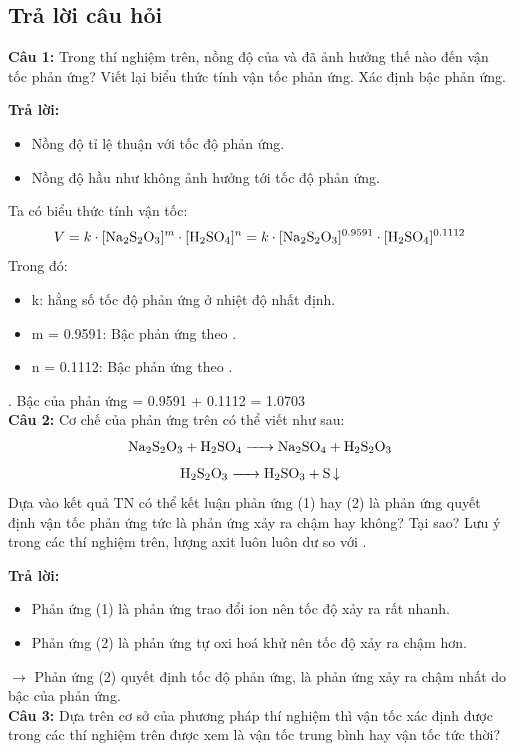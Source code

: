 \documentclass[12pt]{article}
\begin{document}
\subsection{Trả lời câu hỏi}
\textbf{Câu 1:} Trong thí nghiệm trên, nồng độ của  và  đã ảnh
hưởng thế nào đến vận tốc phản ứng? Viết lại biểu thức tính vận tốc phản
ứng. Xác định bậc phản ứng.

\textbf{Trả lời:}
\begin{itemize}
    \item Nồng độ  tỉ lệ thuận với tốc độ phản ứng.
    \item  Nồng độ  hầu như không ảnh hưởng tới tốc độ phản ứng.
\end{itemize}
Ta có biểu thức tính vận tốc:
\[
V = k \cdot [\ce{Na2S2O3}]^m \cdot [\ce{H2SO4}]^n = k \cdot [\ce{Na2S2O3}]^{0.9591} \cdot [\ce{H2SO4}]^{0.1112}
\]
Trong đó:
\begin{itemize}
    \item k: hằng số tốc độ phản ứng ở nhiệt độ nhất định.
    \item m = 0.9591: Bậc phản ứng theo .
    \item n = 0.1112: Bậc phản ứng theo .
\end{itemize} .
Bậc của phản ứng = 0.9591 + 0.1112 = 1.0703 \\
\textbf{Câu 2:} Cơ chế của phản ứng trên có thể viết như sau:
\begin{equation}
    \ce{Na2S2O3 + H2SO4 -> Na2SO4 + H2S2O3}
\end{equation}
\begin{equation}
    \ce{H2S2O3 -> H2SO3 + S \downarrow}
\end{equation}
Dựa vào kết quả TN có thể kết luận phản ứng (1) hay (2) là phản ứng quyết định
vận tốc phản ứng tức là phản ứng xảy ra chậm hay không? Tại sao? Lưu ý trong các
thí nghiệm trên, lượng axit  luôn luôn dư so với .

\textbf{Trả lời:}
\begin{itemize}
    \item Phản ứng (1) là phản ứng trao đổi ion nên tốc độ xảy ra rất nhanh.
    \item Phản ứng (2) là phản ứng tự oxi hoá khử nên tốc độ xảy ra chậm hơn.
\end{itemize}
$\rightarrow$ Phản ứng (2) quyết định tốc độ phản ứng, là phản ứng xảy ra chậm nhất do bậc của phản ứng. \\
\textbf{Câu 3:} Dựa trên cơ sở của phương pháp thí nghiệm thì vận tốc xác định được trong các thí nghiệm trên được xem là vận tốc trung bình hay vận tốc tức thời?
\end{document}
